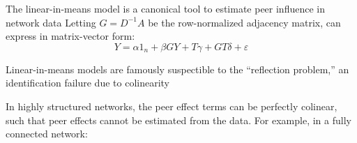 \documentclass[final]{beamer}
\newlength{\colwidth}
\begin{document}
\begin{frame}[t]
\begin{columns}[t]
\begin{column}{\colwidth}
\begin{block}{The linear-in-means model is a canonical tool to estimate peer influence in network data}
                Letting $G = D^{-1} A$ be the row-normalized adjacency matrix, can express in matrix-vector form:
                \begin{equation*} \label{eq:lim-mv}
                    Y = \alpha 1_n + \beta G Y + T \gamma + G T \delta + \varepsilon
                \end{equation*}
            \end{block}

            \begin{block}{Linear-in-means models are famously suspectible to the ``reflection problem,'' an identification failure due to colinearity}

                In highly structured networks, the peer effect terms can be perfectly colinear, such that peer effects cannot be estimated from the data. For example, in a fully connected network:

                \begin{figure}
                    \begin{minipage}{0.49\textwidth}
                        \centering
\end{minipage}
\end{figure}
\end{block}
\end{column}
\end{columns}
\end{frame}
\end{document}
